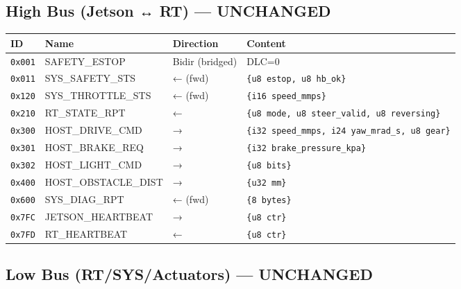 \documentclass[12pt,a4paper,oneside]{report}
\begin{document}
\subsection{High Bus (Jetson ↔ RT) ---
UNCHANGED}\label{high-bus-jetson-rt-unchanged}

\begin{longtable}[]{@{}llll@{}}
\toprule\noalign{}
ID & Name & Direction & Content \\
\midrule\noalign{}
\endhead
\bottomrule\noalign{}
\endlastfoot
\texttt{0x001} & SAFETY\_ESTOP & Bidir (bridged) & DLC=0 \\
\texttt{0x011} & SYS\_SAFETY\_STS & ← (fwd) &
\texttt{\{u8\ estop,\ u8\ hb\_ok\}} \\
\texttt{0x120} & SYS\_THROTTLE\_STS & ← (fwd) & \texttt{\{i16\ speed\_mmps\}} \\
\texttt{0x210} & RT\_STATE\_RPT & ← &
\texttt{\{u8\ mode,\ u8\ steer\_valid,\ u8\ reversing\}} \\
\texttt{0x300} & HOST\_DRIVE\_CMD & → &
\texttt{\{i32\ speed\_mmps,\ i24\ yaw\_mrad\_s,\ u8\ gear\}} \\
\texttt{0x301} & HOST\_BRAKE\_REQ & → &
\texttt{\{i32\ brake\_pressure\_kpa\}} \\
\texttt{0x302} & HOST\_LIGHT\_CMD & → & \texttt{\{u8\ bits\}} \\
\texttt{0x400} & HOST\_OBSTACLE\_DIST & → & \texttt{\{u32\ mm\}} \\
\texttt{0x600} & SYS\_DIAG\_RPT & ← (fwd) & \texttt{\{8\ bytes\}} \\
\texttt{0x7FC} & JETSON\_HEARTBEAT & → & \texttt{\{u8\ ctr\}} \\
\texttt{0x7FD} & RT\_HEARTBEAT & ← & \texttt{\{u8\ ctr\}} \\
\end{longtable}

\subsection{Low Bus (RT/SYS/Actuators) ---
UNCHANGED}\label{low-bus-rtsysactuators-unchanged}
\end{document}
